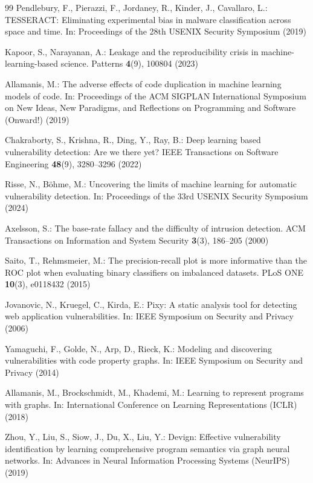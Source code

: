 \documentclass[pdflatex,sn-mathphys-num]{sn-jnl}
\begin{document}
\begin{thebibliography}{99}
Pendlebury, F., Pierazzi, F., Jordaney, R., Kinder, J., Cavallaro, L.:
TESSERACT: Eliminating experimental bias in malware classification across
space and time. In: Proceedings of the 28th USENIX Security Symposium (2019)

Kapoor, S., Narayanan, A.: Leakage and the reproducibility crisis in
machine-learning-based science. Patterns \textbf{4}(9), 100804 (2023)

Allamanis, M.: The adverse effects of code duplication in machine learning
models of code. In: Proceedings of the ACM SIGPLAN International Symposium on
New Ideas, New Paradigms, and Reflections on Programming and Software
(Onward!) (2019)

Chakraborty, S., Krishna, R., Ding, Y., Ray, B.: Deep learning based
vulnerability detection: Are we there yet? IEEE Transactions on Software
Engineering \textbf{48}(9), 3280--3296 (2022)

Risse, N., B{\"o}hme, M.: Uncovering the limits of machine learning for
automatic vulnerability detection. In: Proceedings of the 33rd USENIX Security
Symposium (2024)

Axelsson, S.: The base-rate fallacy and the difficulty of intrusion detection.
ACM Transactions on Information and System Security \textbf{3}(3), 186--205
(2000)

Saito, T., Rehmsmeier, M.: The precision-recall plot is more informative than
the ROC plot when evaluating binary classifiers on imbalanced datasets. PLoS
ONE \textbf{10}(3), e0118432 (2015)

Jovanovic, N., Kruegel, C., Kirda, E.: Pixy: A static analysis tool for
detecting web application vulnerabilities. In: IEEE Symposium on Security and
Privacy (2006)

Yamaguchi, F., Golde, N., Arp, D., Rieck, K.: Modeling and discovering
vulnerabilities with code property graphs. In: IEEE Symposium on Security and
Privacy (2014)

Allamanis, M., Brockschmidt, M., Khademi, M.: Learning to represent programs
with graphs. In: International Conference on Learning Representations (ICLR)
(2018)

Zhou, Y., Liu, S., Siow, J., Du, X., Liu, Y.: Devign: Effective vulnerability
identification by learning comprehensive program semantics via graph neural
networks. In: Advances in Neural Information Processing Systems (NeurIPS)
(2019)


\end{thebibliography}
\end{document}
